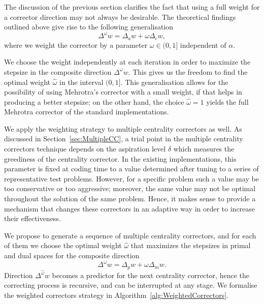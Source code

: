 The discussion of the previous section clarifies the fact that
using a full weight for a corrector direction may not always be
desirable.
The theoretical findings 
outlined above give rise to the following generalisation
\[
  \Delta^\omega w = \Delta_a w +\omega\Delta_c w,
\]
where we weight the corrector by a parameter $\omega\in(0,1]$ 
independent of $\alpha$.

We choose the weight independently at each iteration in order 
to maximize the stepsize in the composite direction $\Delta^\omega w$.
This gives us the freedom to find the optimal weight 
$\hat\omega$ in the interval $(0,1]$.
%
This generalisation allows for the possibility of using Mehrotra's 
corrector with a small weight, if that helps in producing a better
stepsize; on the other hand, 
the choice $\hat\omega=1$ yields the full Mehrotra corrector of
the standard implementations. 

We apply the weighting strategy to multiple centrality correctors 
as well. 
As discussed in Section~\ref{sec:MultipleCC}, a trial point 
in the multiple centrality correctors technique depends on the
aspiration level
$\delta$ which measures the greediness of the centrality corrector. 
In the existing implementations, this parameter is fixed at coding time 
to a value determined after tuning to a series of representative 
test problems. However, for a specific problem such a value may be 
too conservative or too aggressive; moreover, the same value may not 
be optimal throughout the solution of the same problem. 
Hence, it makes sense to provide 
a mechanism that changes these correctors in an adaptive way in order 
to increase their effectiveness.

We propose to generate a sequence of multiple centrality 
correctors, and for each of them we choose the optimal weight 
$\hat \omega$ that  maximizes the stepsizes in primal and dual spaces 
for the composite direction
\[
 \Delta^\omega w = \Delta_p w +\omega\Delta_m w.
\]
Direction $\Delta^{\hat\omega} w$ becomes
a predictor for the next centrality corrector, hence the correcting process
is recursive, and can be interrupted at any stage.
We formalise the weighted correctors strategy in 
Algorithm~\ref{alg:WeightedCorrectors}.

